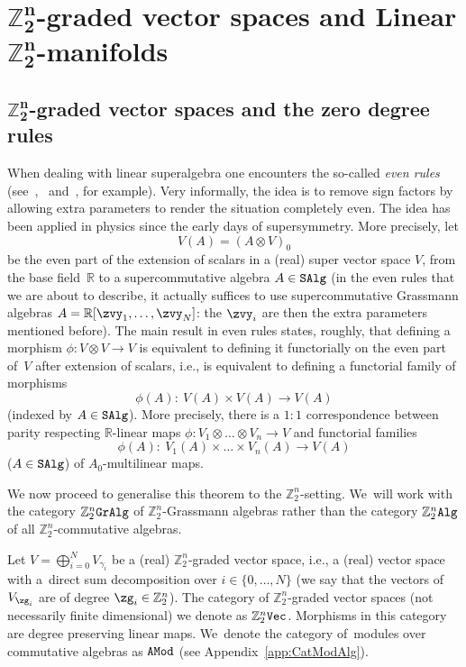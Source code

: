 \documentclass[10pt,a4paper]{amsart}
\newcommand{\catname}[1]{\textnormal{\texttt{#1}}}
\newcommand{\R}{{\mathbb R}}
\newcommand{\Z}{{\mathbb Z}}
\newcommand{\0}{\otimes}
\newcommand{\z}{\Z_2^n}
\numberwithin{equation}{section}
\begin{document}


\section[Z2n-graded vector spaces and Linear Z2n-manifolds]
{$\boldsymbol{\Z_{2}^{n}}$-graded vector spaces and Linear $\boldsymbol{\Z_2^n}$-manifolds}

\subsection[Z2n-graded vector spaces and the zero degree rules]%
{$\boldsymbol{\Z_2^n}$-graded vector spaces and the zero degree rules }
When dealing with linear superalgebra one encounters the so-called \emph{even rules} (see~\cite[Section~1.8]{Carmeli:2011},~\cite[Section~1.7]{Deligne:1999} and~\cite[pp.~123--124]{Varadarajan:2004}, for example). Very informally, the idea is to remove sign factors by allowing extra parameters to render the situation completely even. The idea has been applied in physics since the early days of supersymmetry. More precisely, let
\[
V(A)=(A\otimes V)_0
\]
be the even part of the extension of scalars in a (real) super vector space $V$, from the base field~$\R$ to a supercommutative algebra $A\in\tt SAlg$ (in the even rules that we are about to describe, it actually suffices to use supercommutative Grassmann algebras $A=\R[\zvy_1,\dots, \zvy_N]$: the $\zvy_i$ are then the extra parameters mentioned before). The main result in even rules states, roughly, that defining a morphism $\phi\colon V\0 V\to V$ is equivalent to defining it functorially on the even part of~$V$ after extension of scalars, i.e., is equivalent to defining a functorial family of morphisms
\[
\phi(A)\colon\ V(A)\times V(A)\to V(A)
\]
(indexed by $A\in\tt SAlg$). More precisely, there is a $1:1$ correspondence between parity respecting $\R$-linear maps $\phi\colon V_1\otimes\dots\otimes V_n\to V$ and functorial families
\[
\phi(A)\colon\ V_1(A)\times \dots \times V_n(A)\to V(A)
\]
($A\in\tt SAlg$) of $A_0$-multilinear maps.

We now proceed to generalise this theorem to the $\Z_2^n$-setting. We~will work with the category $\Z_2^n\tt GrAlg$ of $\Z_2^n$-Grassmann algebras rather than the category $\Z_2^n\tt Alg$ of all $\Z_2^n$-commutative algebras.

Let ${V} =\bigoplus_{i = 0}^{N} {V}_{\gamma_i}$ be a (real) $\Z_2^n$-graded vector space, i.e., a (real) vector space with a~direct sum decomposition over $i\in\{0,\dots,N\}$ (we say that the vectors of $V_{\zg_i}$ are of degree \mbox{$\zg_i\in\z$}). The category of $\Z_2^n$-graded vector spaces (not necessarily finite dimensional) we denote as $\Z_2^n\catname{Vec}$. Morphisms in this category are degree preserving linear maps. We~denote the category of~modu\-les over commutative algebras as $\tt AMod$ (see Appendix~\ref{app:CatModAlg}).
\end{document}
